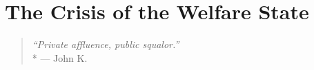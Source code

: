 


\section{The Crisis of the Welfare State}
\begin{quote}
	\emph{``Private affluence, public squalor.''}
	\\*
	--- John K.~\citet{Galbraith1959}
\end{quote}


